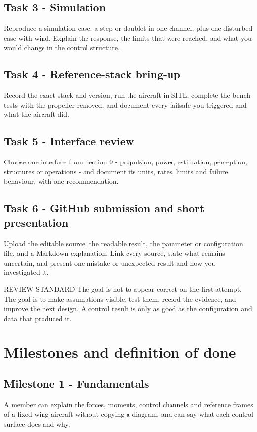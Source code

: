 \documentclass[11pt,a4paper]{article}
\begin{document}
\subsection{Task 3 - Simulation}
Reproduce a simulation case: a step or doublet in one channel, plus one
disturbed case with wind. Explain the response, the limits that were reached,
and what you would change in the control structure.

\subsection{Task 4 - Reference-stack bring-up}
Record the exact stack and version, run the aircraft in SITL, complete the
bench tests with the propeller removed, and document every failsafe you
triggered and what the aircraft did.

\subsection{Task 5 - Interface review}
Choose one interface from Section 9 - propulsion, power, estimation,
perception, structures or operations - and document its units, rates, limits
and failure behaviour, with one recommendation.

\subsection{Task 6 - GitHub submission and short presentation}
Upload the editable source, the readable result, the parameter or configuration
file, and a Markdown explanation. Link every source, state what remains
uncertain, and present one mistake or unexpected result and how you investigated
it.

\begin{callout}{REVIEW STANDARD}
  The goal is not to appear correct on the first attempt. The goal is to make
  assumptions visible, test them, record the evidence, and improve the next
  design. A control result is only as good as the configuration and data that
  produced it.
\end{callout}

\section{Milestones and definition of done}

\subsection{Milestone 1 - Fundamentals}
A member can explain the forces, moments, control channels and reference frames
of a fixed-wing aircraft without copying a diagram, and can say what each
control surface does and why.
\end{document}
